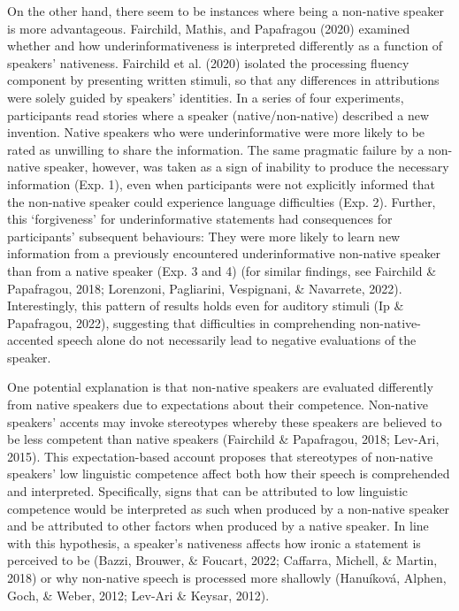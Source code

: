 \documentclass[
  man,floatsintext]{apa7}
\begin{document}
On the other hand, there seem to be instances where being a non-native speaker is more advantageous. Fairchild, Mathis, and Papafragou (2020) examined whether and how underinformativeness is interpreted differently as a function of speakers' nativeness. Fairchild et al. (2020) isolated the processing fluency component by presenting written stimuli, so that any differences in attributions were solely guided by speakers' identities. In a series of four experiments, participants read stories where a speaker (native/non-native) described a new invention. Native speakers who were underinformative were more likely to be rated as unwilling to share the information. The same pragmatic failure by a non-native speaker, however, was taken as a sign of inability to produce the necessary information (Exp. 1), even when participants were not explicitly informed that the non-native speaker could experience language difficulties (Exp. 2). Further, this `forgiveness' for underinformative statements had consequences for participants' subsequent behaviours: They were more likely to learn new information from a previously encountered underinformative non-native speaker than from a native speaker (Exp. 3 and 4) (for similar findings, see Fairchild \& Papafragou, 2018; Lorenzoni, Pagliarini, Vespignani, \& Navarrete, 2022). Interestingly, this pattern of results holds even for auditory stimuli (Ip \& Papafragou, 2022), suggesting that difficulties in comprehending non-native-accented speech alone do not necessarily lead to negative evaluations of the speaker.

One potential explanation is that non-native speakers are evaluated differently from native speakers due to expectations about their competence. Non-native speakers' accents may invoke stereotypes whereby these speakers are believed to be less competent than native speakers (Fairchild \& Papafragou, 2018; Lev-Ari, 2015). This expectation-based account proposes that stereotypes of non-native speakers' low linguistic competence affect both how their speech is comprehended and interpreted. Specifically, signs that can be attributed to low linguistic competence would be interpreted as such when produced by a non-native speaker and be attributed to other factors when produced by a native speaker. In line with this hypothesis, a speaker's nativeness affects how ironic a statement is perceived to be (Bazzi, Brouwer, \& Foucart, 2022; Caffarra, Michell, \& Martin, 2018) or why non-native speech is processed more shallowly (Hanuíková, Alphen, Goch, \& Weber, 2012; Lev-Ari \& Keysar, 2012).
\end{document}
